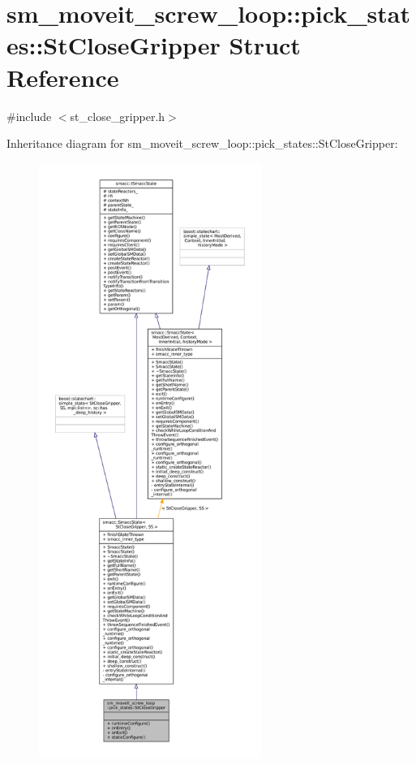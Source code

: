 \hypertarget{structsm__moveit__screw__loop_1_1pick__states_1_1StCloseGripper}{}\section{sm\+\_\+moveit\+\_\+screw\+\_\+loop\+:\+:pick\+\_\+states\+:\+:St\+Close\+Gripper Struct Reference}
\label{structsm__moveit__screw__loop_1_1pick__states_1_1StCloseGripper}


{\ttfamily \#include $<$st\+\_\+close\+\_\+gripper.\+h$>$}



Inheritance diagram for sm\+\_\+moveit\+\_\+screw\+\_\+loop\+:\+:pick\+\_\+states\+:\+:St\+Close\+Gripper\+:
\nopagebreak
\begin{figure}[H]
\begin{center}
\leavevmode
\includegraphics[height=550pt]{structsm__moveit__screw__loop_1_1pick__states_1_1StCloseGripper__inherit__graph}
\end{center}
\end{figure}


